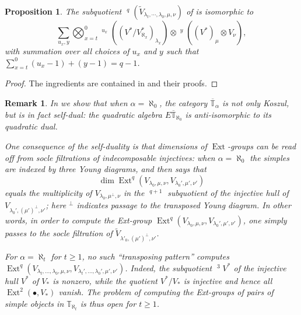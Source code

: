 \documentclass[11pt]{article}
\theoremstyle{plain}
\newtheorem{proposition}[lemma]{Proposition}
\theoremstyle{nonumberplain}
\theoremstyle{plain}
\newtheorem{remark}[lemma]{Remark}
\theoremstyle{nonumberplain}
\newtheorem{proof}{Proof}
\newcommand\bT{\mathbb T}
\newcommand\al{\aleph}
\DeclareMathOperator{\ext}{\mathrm{Ext}}
\DeclareMathOperator{\usoc}{\underline{\mathrm{soc}}}
\begin{document}
\begin{proposition}\label{pr.quot_filt}
The subquotient  $\usoc^q(\widetilde{V}_{\lambda_t,\cdots,\lambda_0,\mu,\nu})$ of   is isomorphic to
\begin{equation*}
  \sum_{u_x,y} \bigotimes_{x=t}^0\usoc^{u_x}((V^*/V^*_{\al_x})_{\lambda_x})\otimes \usoc^y((V^*)_{\mu}\otimes V_{\nu}),
\end{equation*}
with summation over all choices of $u_x$ and $y$ such that 
$
  \sum_{x=t}^0 (u_x-1)+(y-1)=q-1$.
\end{proposition}
\begin{proof}
  The ingredients are contained in 
  and their proofs.
%
%
\end{proof}


\begin{remark}\label{re.non-sd}
  In \cite[$\S$3.7]{us} we show that when $\alpha=\aleph_0$, the
  category $\overline{\bT}_\alpha$ is not only Koszul, but is in fact
  {\it self-dual}: the quadratic algebra $E\overline{\bT}_{\aleph_0}$
  is anti-isomorphic to its quadratic dual.

  One consequence of the self-duality is that dimensions of $\ext$-groups can be read off from socle filtrations of indecomposable
  injectives: when $\alpha=\aleph_0$ the simples  are
  indexed by three Young diagrams, and \cite[Corollary 3.34]{us} then
  says that
  \begin{equation*}
    \dim \ext^q(V_{\lambda_0,\mu,\nu},V_{\lambda_0',\mu',\nu'}) 
  \end{equation*}
  equals the multiplicity of $V_{\lambda_0,\mu^{\perp},\nu}$ in the
  $\usoc^{q+1}$ subquotient of the injective hull of
  $V_{\lambda_0',(\mu')^\perp,\nu'}$; here $^\perp$ indicates passage to the transposed Young diagram.
  In other words, in order to compute the Ext-group $ \ext^q(V_{\lambda_0,\mu,\nu},V_{\lambda_0',\mu',\nu'})$, one simply passes to the socle filtration of $\widetilde{V}_{\lambda'_0,(\mu')^\perp,\nu'}$.  
  
  For $\alpha= \aleph_t$ for $t\geq 1$, no such ``transposing pattern'' computes $ \ext^q(V_{\lambda_t,\ldots,\lambda_0,\mu,\nu},V_{\lambda_t',\ldots,\lambda_0',\mu',\nu'})$.  Indeed, the subquotient $\usoc^3 V^*$ of the injective hull $V^*$
  of $V_*$ is nonzero, while the quotient
  $V^*/V_*$ is injective and hence all $\ext^2(\bullet,V_*)$ vanish.  The problem of computing the Ext-groups of pairs of simple objects in $\bT_{\aleph_t}$ is thus open for $t\geq 1$.
\end{remark}
\end{document}
